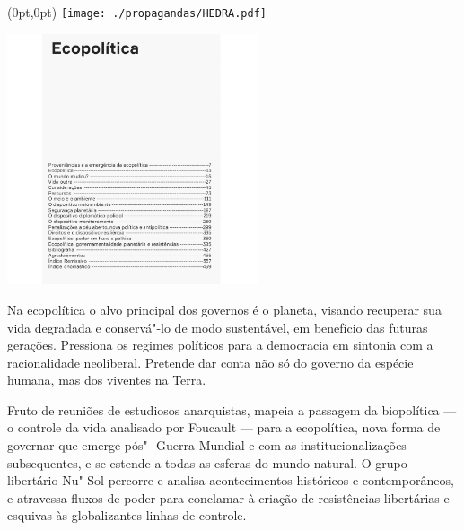 \pagestyle{hedra}
\label{hedra}

\begin{textblock*}{5.625in}(0pt,0pt)%
\vspace*{-3.5cm}
\hspace*{-2.77cm}\texttt{[image: ./propagandas/HEDRA.pdf]}
\end{textblock*}

\pagebreak


\begin{center}
\hspace*{-3.6cm}
\hspace*{3.1cm}\includegraphics[width=74mm]{./grid/passetti.jpeg}
\end{center}

\hspace*{-7cm}\hrulefill\hspace*{-7cm}

\medskip

\noindent{}Na ecopolítica o alvo principal dos governos é o planeta, visando recuperar sua vida degradada e conservá"-lo de modo sustentável, em benefício das futuras gerações. Pressiona os regimes políticos para a democracia em sintonia com a racionalidade neoliberal. Pretende dar conta não só do governo da espécie humana, mas dos viventes na Terra.

Fruto de reuniões de estudiosos anarquistas, {} mapeia a passagem da biopolítica --- o controle da vida analisado por Foucault --- para a ecopolítica, nova forma de governar que emerge pós"- Guerra Mundial e com as institucionalizações subsequentes, e se estende a todas as esferas do mundo natural. O grupo libertário Nu"-Sol percorre e analisa acontecimentos históricos e contemporâneos, e atravessa fluxos de poder para conclamar à criação de resistências libertárias e esquivas às globalizantes linhas de controle.


